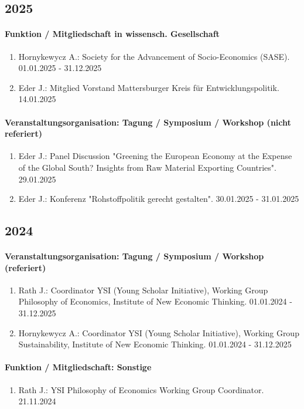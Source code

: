 \subsection*{2025}\paragraph{Funktion / Mitgliedschaft in wissensch. Gesellschaft}
\begin{enumerate}[leftmargin=*, labelsep=0.5cm]
\item Hornykewycz A.: Society for the Advancement of Socio-Economics (SASE). 01.01.2025 - 31.12.2025
\item Eder J.: Mitglied Vorstand Mattersburger Kreis für Entwicklungspolitik. 14.01.2025
\end{enumerate}
\paragraph{Veranstaltungsorganisation: Tagung / Symposium / Workshop (nicht referiert)}
\begin{enumerate}[leftmargin=*, labelsep=0.5cm]
\item Eder J.: Panel Discussion "Greening the European Economy at the Expense of the Global South? Insights from Raw Material Exporting Countries". 29.01.2025
\item Eder J.: Konferenz "Rohstoffpolitik gerecht gestalten". 30.01.2025 - 31.01.2025
\end{enumerate}\subsection*{2024}\paragraph{Veranstaltungsorganisation: Tagung / Symposium / Workshop (referiert)}
\begin{enumerate}[leftmargin=*, labelsep=0.5cm]
\item Rath J.: Coordinator YSI (Young Scholar Initiative), Working Group Philosophy of Economics,  Institute of New Economic Thinking. 01.01.2024 - 31.12.2025
\item Hornykewycz A.: Coordinator YSI (Young Scholar Initiative), Working Group Sustainability, Institute of New Economic Thinking. 01.01.2024 - 31.12.2025
\end{enumerate}
\paragraph{Funktion / Mitgliedschaft: Sonstige}
\begin{enumerate}[leftmargin=*, labelsep=0.5cm]
\item Rath J.: YSI Philosophy of Economics Working Group Coordinator. 21.11.2024
\end{enumerate}

